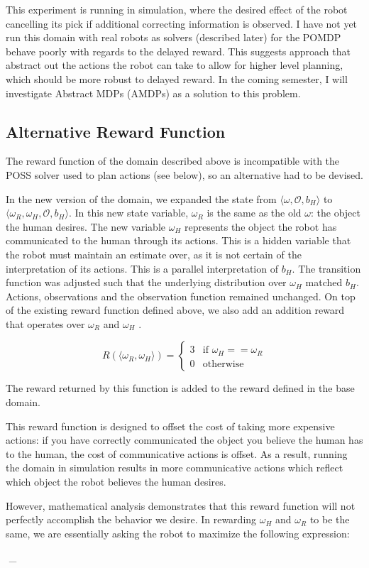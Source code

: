 \documentclass{article}
\begin{document}
This experiment is running in simulation, where the desired effect of the robot cancelling its pick if additional correcting information is observed. I have not yet run this domain with real robots as solvers (described later) for the POMDP behave poorly with regards to the delayed reward. This suggests approach that abstract out the actions the robot can take to allow for higher level planning, which should be more robust to delayed reward. In the coming semester, I will investigate Abstract MDPs (AMDPs) as a solution to this problem. 

\subsection{Alternative Reward Function}

The reward function of the domain described above is incompatible with the POSS solver used to plan actions (see below), so an alternative had to be devised. 

In the new version of the domain, we expanded the state from $\langle \omega, \mathcal{O}, b_H \rangle$ to $\langle \omega_R, \omega_H, \mathcal{O}, b_H \rangle$. In this new state variable, $\omega_R$ is the same as the old $\omega$: the object the human desires. The new variable $\omega_H$ represents the object the robot has communicated to the human through its actions. This is a hidden variable that the robot must maintain an estimate over, as it is not certain of the interpretation of its actions. This is a parallel interpretation of $b_H$. The transition function was adjusted such that the underlying distribution over $\omega_H$ matched $b_H$. Actions, observations and the observation function remained unchanged. On top of the existing reward function defined above, we also add an addition reward that operates over $\omega_R$ and $\omega_H$ . 

\begin{equation*}
	R(\langle \omega_R, \omega_H\rangle) = \begin{cases}
		3  & \text{if } \omega_H == \omega_R \\
		0  & \text{otherwise}
	\end{cases}
\end{equation*}

The reward returned by this function is added to the reward defined in the base domain. 

This reward function is designed to offset the cost of taking more expensive actions: if you have correctly communicated the object you believe the human has to the human, the cost of communicative actions is offset. As a result, running the domain in simulation results in more communicative actions which reflect which object the robot believes the human desires. 

However, mathematical analysis demonstrates that this reward function will not perfectly accomplish the behavior we desire. In rewarding $\omega_H$ and $\omega_R$ to be the same, we are essentially asking the robot to maximize the following expression: 

$$ \argmax \sum_\omega
\end{document}
